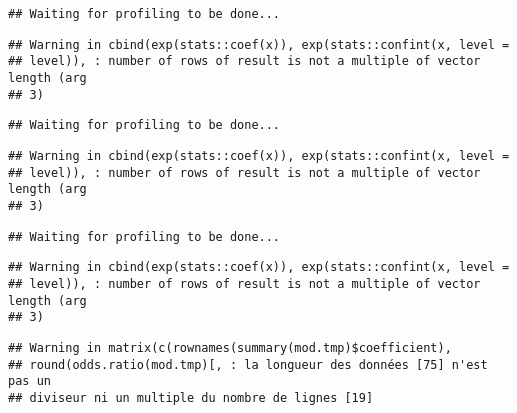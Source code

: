 \documentclass[]{article}
\newenvironment{Shaded}{\begin{snugshade}}{\end{snugshade}}
\newcommand{\KeywordTok}[1]{\textcolor[rgb]{0.13,0.29,0.53}{\textbf{#1}}}
\newcommand{\DataTypeTok}[1]{\textcolor[rgb]{0.13,0.29,0.53}{#1}}
\newcommand{\StringTok}[1]{\textcolor[rgb]{0.31,0.60,0.02}{#1}}
\newcommand{\OperatorTok}[1]{\textcolor[rgb]{0.81,0.36,0.00}{\textbf{#1}}}
\newcommand{\NormalTok}[1]{#1}
\begin{document}
\begin{verbatim}
## Waiting for profiling to be done...
\end{verbatim}

\begin{verbatim}
## Warning in cbind(exp(stats::coef(x)), exp(stats::confint(x, level =
## level)), : number of rows of result is not a multiple of vector length (arg
## 3)
\end{verbatim}

\begin{verbatim}
## Waiting for profiling to be done...
\end{verbatim}

\begin{verbatim}
## Warning in cbind(exp(stats::coef(x)), exp(stats::confint(x, level =
## level)), : number of rows of result is not a multiple of vector length (arg
## 3)
\end{verbatim}

\begin{verbatim}
## Waiting for profiling to be done...
\end{verbatim}

\begin{verbatim}
## Warning in cbind(exp(stats::coef(x)), exp(stats::confint(x, level =
## level)), : number of rows of result is not a multiple of vector length (arg
## 3)
\end{verbatim}

\begin{verbatim}
## Warning in matrix(c(rownames(summary(mod.tmp)$coefficient),
## round(odds.ratio(mod.tmp)[, : la longueur des données [75] n'est pas un
## diviseur ni un multiple du nombre de lignes [19]
\end{verbatim}

\begin{Shaded}
\end{Shaded}
\end{document}
